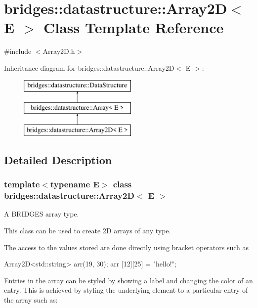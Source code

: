 \hypertarget{classbridges_1_1datastructure_1_1_array2_d}{}\section{bridges\+:\+:datastructure\+:\+:Array2D$<$ E $>$ Class Template Reference}
\label{classbridges_1_1datastructure_1_1_array2_d}


{\ttfamily \#include $<$Array2\+D.\+h$>$}

Inheritance diagram for bridges\+:\+:datastructure\+:\+:Array2D$<$ E $>$\+:\begin{figure}[H]
\begin{center}
\leavevmode
\includegraphics[height=3.000000cm]{classbridges_1_1datastructure_1_1_array2_d}
\end{center}
\end{figure}


\subsection{Detailed Description}
\subsubsection*{template$<$typename E$>$\newline
class bridges\+::datastructure\+::\+Array2\+D$<$ E $>$}

A B\+R\+I\+D\+G\+ES array type. 

This class can be used to create 2D arrays of any type.

The access to the values stored are done directly using bracket operators such as


\begin{DoxyCode}
Array2D<std::string> arr(19, 30);
arr [12][25] = \textcolor{stringliteral}{"hello!"};
\end{DoxyCode}


Entries in the array can be styled by showing a label and changing the color of an entry. This is achieved by styling the underlying element to a particular entry of the array such as\+:



